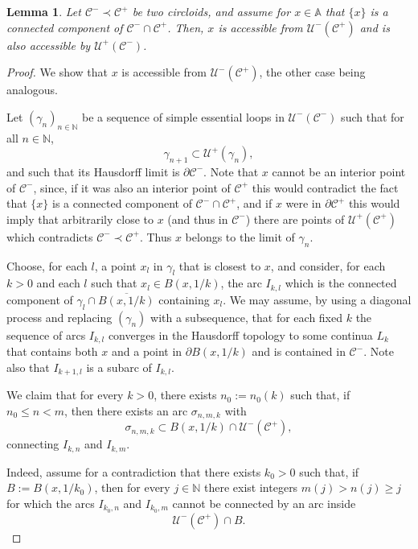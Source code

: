 \documentclass[12pt,a4paper]{amsart}
\newtheorem{lemma}[thm]{Lemma}
\theoremstyle{definition}
\theoremstyle{remark}
\newcommand{\N}{\mathbb{N}}
\newcommand{\A}{\mathbb{A}}
\begin{document}
\begin{lemma}\label{lemmainersecaoacessivel}
Let $\mathcal{C}^-\prec\mathcal{C}^+$ be two circloids, and assume for $x\in\A$ that $\{x\}$ is a connected component of 
$\mathcal{C}^{-}\cap\mathcal{C}^{+}$. Then, $x$ is accessible from $\mathcal{U}^{-}(\mathcal{C}^{+})$ and is also accessible by $\mathcal{U}^{+}(\mathcal{C}^{-})$.
\end{lemma}
\begin{proof}
We show that $x$ is accessible from $\mathcal{U}^{-}(\mathcal{C}^{+})$, the other case being analogous.

Let $(\gamma_n)_{n\in\N}$ be a sequence of simple essential loops in $\mathcal{U}^{-}(\mathcal{C}^{-})$
 such that for all $n \in \N$,
\[
\gamma_{n+1} \subset \mathcal{U}^+(\gamma_n),
\]
and such that its Hausdorff limit  is $\partial \mathcal{C}^{-}$. Note that $x$ cannot be an interior point of $\mathcal{C}^{-}$, since, if it was also an interior point of $\mathcal{C}^{+}$ this would contradict the fact that $\{x\}$ is a connected component of $\mathcal{C}^{-}\cap\mathcal{C}^{+}$, and if $x$ were in $\partial \mathcal{C}^{+}$ this would imply that arbitrarily close to $x$ (and thus in $\mathcal{C}^{-}$) there are points of $\mathcal{U}^{+}(\mathcal{C}^{+})$ which contradicts $\mathcal{C}^-\prec\mathcal{C}^+$. Thus $x$ belongs to the limit of $\gamma_n$. 

Choose, for each $l$, a point $x_l$ in $\gamma_l$ that is closest to $x$, and consider, for each $k>0$ and each $l$ such that $x_l\in B(x,1/k)$, the arc $I_{k,l}$ which is the connected component of $\gamma_l \cap \overline{B(x,1/k)}$ containing $x_l$. We may assume, by using a diagonal process and replacing $(\gamma_n)$ with a subsequence, that for each fixed $k$ the sequence of arcs $I_{k,l}$ converges in the Hausdorff topology to some continua $L_k$ that contains both $x$ and a point in $\partial B(x,1/k)$ and is contained in $\mathcal{C}^{-}$. Note also that $I_{k+1,l}$ is a subarc of $I_{k,l}$.

 We claim that for every $k>0$, there exists $n_0:=n_0(k)$ such that, if  $n_0 \le n < m$, then there exists an arc $\sigma_{n,m,k}$ with
\[
\sigma_{n,m,k}\subset B(x,1/k) \cap \mathcal{U}^-(\mathcal{C}^+),
\]
connecting $I_{k,n}$ and $I_{k,m}$.
\medskip

Indeed, assume for a contradiction that there exists $k_0>0$ such that, if $B := B(x,1/k_0)$, then for every $j \in \N$
there exist integers $m(j)>n(j)\ge j$ for which the arcs $I_{k_0,n}$ and $I_{k_0,m}$
cannot be connected by an arc inside
\[
\mathcal{U}^-(\mathcal{C}^+) \cap B.
\]


\end{proof}
\end{document}
